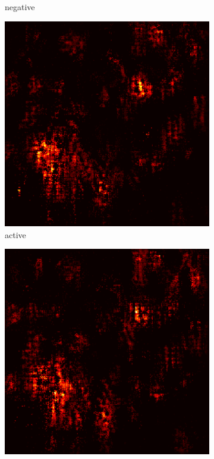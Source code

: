 \documentclass[preprint,12pt]{elsarticle}
\begin{document}
\begin{figure}
\begin{subfigure}{0.14\textwidth}
        \caption{negative}
    \end{subfigure}
    \hfill
    \begin{subfigure}{0.14\textwidth}
        \centering
        \includegraphics[width=\linewidth]{../visualizations/examples/imagenette/cnn/active_saliency_map/7.png}
        \caption{active}
    \end{subfigure}
    \hfill
    \begin{subfigure}{0.14\textwidth}
        \centering
        \includegraphics[width=\linewidth]{../visualizations/examples/imagenette/cnn/inactive_saliency_map/7.png}

\end{subfigure}
\end{figure}
\end{document}
